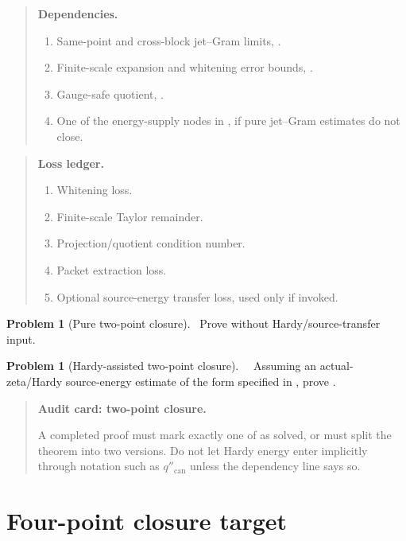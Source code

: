 \documentclass[11pt,a4paper]{amsart}
\newcommand{\Status}[1]{\textnormal{\fbox{\scriptsize\textsf{#1}}}}
\newcommand{\Open}{\Status{OPEN}}
\newcommand{\Optional}{\Status{OPTIONAL}}
\newcommand{\can}{\mathrm{can}}
\theoremstyle{plain}
\theoremstyle{definition}
\newtheorem{problem}[theorem]{Problem}
\newenvironment{audit}[1]{%
  \begin{quote}\noindent\textbf{Audit card: #1.}\par\smallskip\small
}{\end{quote}}
\newenvironment{dependencies}{%
  \begin{quote}\noindent\textbf{Dependencies.}\par\smallskip\small
  \begin{enumerate}[label=\textup{D\arabic*.},leftmargin=*]
}{\end{enumerate}\end{quote}}
\newenvironment{lossledger}{%
  \begin{quote}\noindent\textbf{Loss ledger.}\par\smallskip\small
  \begin{enumerate}[label=\textup{L\arabic*.},leftmargin=*]
}{\end{enumerate}\end{quote}}
\begin{document}
\begin{dependencies}
\item Same-point and cross-block jet--Gram limits, .
\item Finite-scale expansion and whitening error bounds, .
\item Gauge-safe quotient, .
\item One of the energy-supply nodes in , if pure jet--Gram estimates do not close.
\end{dependencies}

\begin{lossledger}
\item Whitening loss.
\item Finite-scale Taylor remainder.
\item Projection/quotient condition number.
\item Packet extraction loss.
\item Optional source-energy transfer loss, used only if invoked.
\end{lossledger}

\begin{problem}[Pure two-point closure]
\label{prob:pure-two-point-closure}
\Open\
Prove  without Hardy/source-transfer input.
\end{problem}

\begin{problem}[Hardy-assisted two-point closure]
\label{prob:hardy-assisted-two-point-closure}
\Optional\ \Open\
Assuming an actual-zeta/Hardy source-energy estimate of the form specified in , prove .
\end{problem}

\begin{audit}{two-point closure}
A completed proof must mark exactly one of  as solved, or must split the theorem into two versions.  Do not let Hardy energy enter implicitly through notation such as \(q''_{\can}\) unless the dependency line says so.
\end{audit}

\section{Four-point closure target}
\label{sec:four-point-closure-target}
\end{document}
